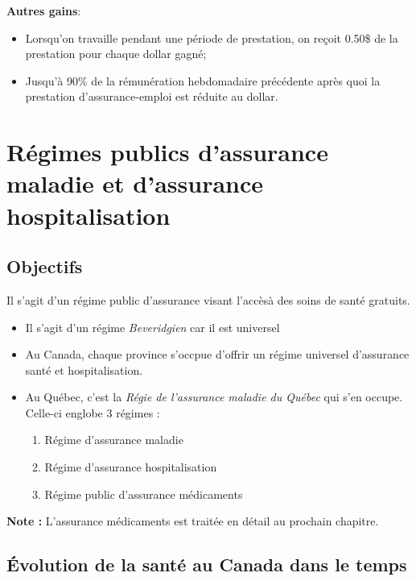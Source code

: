 \documentclass[10pt, french]{article}
\begin{document}
\begin{multicols*}{3}
\begin{definitionNOHFILLsub}[Fiscalité]
\textbf{Autres gains}:
\begin{itemize}[leftmargin = *]
	\item	Lorsqu'on travaille pendant une période de prestation, on reçoit 0.50\$ de la prestation pour chaque dollar gagné;
	\item	Jusqu'à 90\% de la rémunération hebdomadaire précédente après quoi la prestation d'assurance-emploi est réduite au dollar.
\end{itemize}
\end{definitionNOHFILLsub}

\newpage

\section{Régimes publics d'assurance maladie et d'assurance hospitalisation}

\subsection*{Objectifs}
Il s'agit d'un régime public d'assurance visant l'accèsà des soins de santé gratuits.
\begin{itemize}
\item	Il s'agit d'un régime \textit{Beveridgien} car il est universel
\item	Au Canada, chaque province s'occpue d'offrir un régime universel d'assurance santé et hospitalisation.
\item 	Au Québec, c'est la \textit{Régie de l'assurance maladie du Québec} qui s'en occupe. Celle-ci englobe 3 régimes : 
	\begin{enumerate}
	\item	Régime d'assurance maladie
	\item	Régime d'assurance hospitalisation
	\item	Régime public d'assurance médicaments
	\end{enumerate}
\end{itemize}

\textbf{Note : } L'assurance médicaments est traitée en détail au prochain chapitre.

\subsection*{Évolution de la santé au Canada dans le temps}

\end{multicols*}
\end{document}
